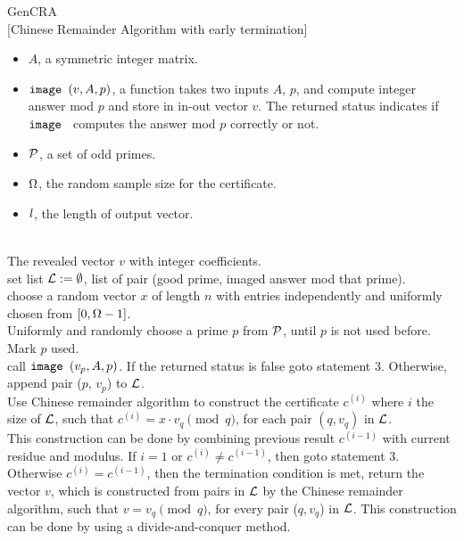 \begin{algorithm} {GenCRA}\\
$[$Chinese Remainder Algorithm with early termination] 
\Inspec
\begin{itemize}
\item
  $A$, a symmetric integer matrix.
\item
  $\mbox{\tt image }(v, A, p)$, a function takes two inputs $A$, $p$, and compute
  integer answer mod $p$ and store in in-out vector $v$.
  The returned status indicates if $\mbox{\tt image }$ computes the answer 
  mod $p$ correctly or not.
\item
  $\mathcal P$, a set of odd primes.
\item
  $\Omega$, the random sample size for the certificate.
\item
  $\mathit l$, the length of output vector.
\end{itemize}
\Outspec\\
The revealed vector $v$ with integer coefficients. \\
\Stmt[1.]
set list $\mathcal L := \emptyset$, list of pair (good prime, imaged answer
 mod that prime).\\
\Stmt[2.]
choose a random vector $x$ of length $n$ with
entries independently and uniformly chosen 
from $[0, \Omega - 1]$.\\
\Stmt[3.]
Uniformly and randomly choose a prime $p$ from $\mathcal P$,
until $p$ is not used before. Mark $p$ used.\\
\Stmt[4.]
call $\mbox{\tt image }(v_p, A, p)$. 
If the returned status is false goto statement 3.
Otherwise, append pair ($p$, $v_p$) to $\mathcal L$.\\
\Stmt[5.]
Use Chinese remainder algorithm to construct 
the certificate $c^{(i)}$ where $i$ the size of $\mathcal L$, such that
$c^{(i)} = x \cdot v_{q} \pmod {q}$, for each pair $(q, v_q)$ in $\mathcal L$.\\
This construction can be done by combining previous result $c^{(i-1)}$ with current
residue and modulus.
\Stmt[6.]
If $i = 1$ or $c^{(i)} \not= c^{(i-1)}$, then goto statement 3.\\
Otherwise $c^{(i)} = c^{(i-1)}$,
then the termination condition is met,
return the vector $v$, which is
constructed from pairs in $\mathcal L$ by the Chinese remainder algorithm,
such that $v = v_q \pmod q$, for every pair ($q, v_q$) in $\mathcal L$.
This construction can be done by using a divide-and-conquer method. 
\end{algorithm}

